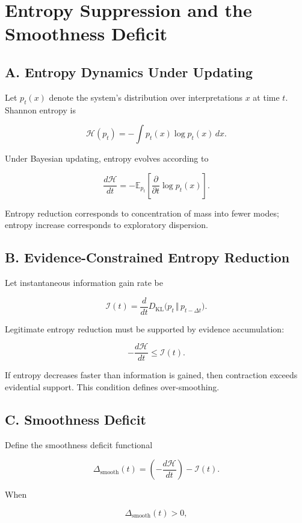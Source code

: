 \documentclass[11pt]{article}
\theoremstyle{remark}
\begin{document}
\section{Entropy Suppression and the Smoothness Deficit}
\label{app:entropy}

\subsection*{A. Entropy Dynamics Under Updating}

Let $p_t(x)$ denote the system's distribution over interpretations $x$ at time $t$. Shannon entropy is

\[
\mathcal{H}(p_t)
=
- \int p_t(x) \log p_t(x)\, dx.
\]

Under Bayesian updating, entropy evolves according to

\[
\frac{d\mathcal{H}}{dt}
=
- \mathbb{E}_{p_t}
\left[
\frac{\partial}{\partial t} \log p_t(x)
\right].
\]

Entropy reduction corresponds to concentration of mass into fewer modes; entropy increase corresponds to exploratory dispersion.

\subsection*{B. Evidence-Constrained Entropy Reduction}

Let instantaneous information gain rate be

\[
\mathcal{I}(t)
=
\frac{d}{dt}
D_{\mathrm{KL}}\big(p_t \,\Vert\, p_{t-\Delta t}\big).
\]

Legitimate entropy reduction must be supported by evidence accumulation:

\[
- \frac{d\mathcal{H}}{dt}
\le
\mathcal{I}(t).
\]

If entropy decreases faster than information is gained, then contraction exceeds evidential support. This condition defines over-smoothing.

\subsection*{C. Smoothness Deficit}

Define the smoothness deficit functional

\[
\Delta_{\text{smooth}}(t)
=
\left(
- \frac{d\mathcal{H}}{dt}
\right)
-
\mathcal{I}(t).
\]

When

\[
\Delta_{\text{smooth}}(t) > 0,
\]
\end{document}
